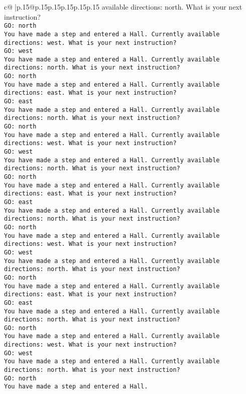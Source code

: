 \documentclass{article}
\begin{document}
{\begin{supertabular}{c@{$\;$}|p{.15\linewidth}@{}p{.15\linewidth}p{.15\linewidth}p{.15\linewidth}p{.15\linewidth}p{.15\linewidth}}
{{{available directions: north. What is your next instruction?\\ \tt GO: north\\ \tt You have made a step and entered a Hall. Currently available directions: west. What is your next instruction?\\ \tt GO: west\\ \tt You have made a step and entered a Hall. Currently available directions: north. What is your next instruction?\\ \tt GO: north\\ \tt You have made a step and entered a Hall. Currently available directions: east. What is your next instruction?\\ \tt GO: east\\ \tt You have made a step and entered a Hall. Currently available directions: north. What is your next instruction?\\ \tt GO: north\\ \tt You have made a step and entered a Hall. Currently available directions: west. What is your next instruction?\\ \tt GO: west\\ \tt You have made a step and entered a Hall. Currently available directions: north. What is your next instruction?\\ \tt GO: north\\ \tt You have made a step and entered a Hall. Currently available directions: east. What is your next instruction?\\ \tt GO: east\\ \tt You have made a step and entered a Hall. Currently available directions: north. What is your next instruction?\\ \tt GO: north\\ \tt You have made a step and entered a Hall. Currently available directions: west. What is your next instruction?\\ \tt GO: west\\ \tt You have made a step and entered a Hall. Currently available directions: north. What is your next instruction?\\ \tt GO: north\\ \tt You have made a step and entered a Hall. Currently available directions: east. What is your next instruction?\\ \tt GO: east\\ \tt You have made a step and entered a Hall. Currently available directions: north. What is your next instruction?\\ \tt GO: north\\ \tt You have made a step and entered a Hall. Currently available directions: west. What is your next instruction?\\ \tt GO: west\\ \tt You have made a step and entered a Hall. Currently available directions: north. What is your next instruction?\\ \tt GO: north\\ \tt You have made a step and entered a Hall. }}}
\end{supertabular}}
\end{document}
